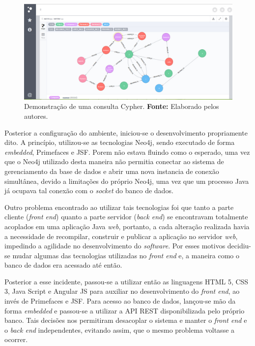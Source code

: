 \begin{figure}[h!]
	\centerline{\includegraphics[scale=0.4]{./imagens/neo4j2.jpg}}
	\caption[Demonstração de uma consulta Cypher.]
	{Demonstração de uma consulta Cypher. \textbf{Fonte:} Elaborado pelos autores.}
	\label{fig:exemplo1}
\end{figure}
 
\newpage

\par Posterior a configuração do ambiente, iniciou-se o desenvolvimento propriamente dito. A princípio, utilizou-se as tecnologias Neo4j, sendo executado de forma \textit{embedded}, Primefaces e JSF. Porem não estava fluindo como o esperado, uma vez que o Neo4j utilizado desta maneira não permitia conectar ao sistema de gerenciamento da base de dados e abrir uma nova instancia de conexão simultânea, devido a limitações do próprio Neo4j, uma vez que um processo Java já ocupava tal conexão com o \textit{socket} do banco de dados.

\par Outro problema encontrado ao utilizar tais tecnologias foi que tanto a parte cliente (\textit{front end}) quanto a parte servidor (\textit{back end}) se encontravam totalmente acoplados em uma aplicação Java \textit{web}, portanto, a cada alteração realizada havia a necessidade de recompilar, construir e publicar a aplicação no servidor \textit{web}, impedindo a agilidade no desenvolvimento do \textit{software}. Por esses motivos decidiu-se mudar algumas das tecnologias utilizadas no \textit{front end} e, a maneira como o banco de dados era acessado até então. 

\par Posterior a esse incidente, passou-se a utilizar então as linguagens HTML 5, CSS 3, Java Script e Angular JS para auxiliar no desenvolvimento do \textit{front end}, ao invés de Primefaces e JSF. Para acesso ao banco de dados, lançou-se mão da forma \textit{embedded} e passou-se a utilizar a API REST disponibilizada pelo próprio banco. Tais decisões nos permitiram desacoplar o sistema e manter o \textit{front end} e o \textit{back end} independentes, evitando assim, que o mesmo problema voltasse a ocorrer.

